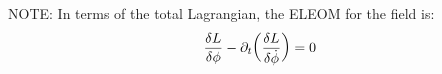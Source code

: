 NOTE: In terms of the total Lagrangian, the ELEOM for the field is:
$$\frac{\delta L}{\delta \phi} - \partial_t \qty(\frac{\delta L}{\delta \dot{\phi}})=0$$
